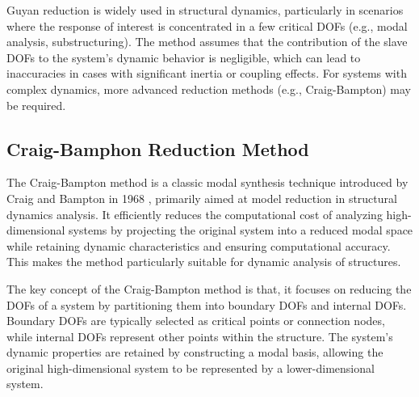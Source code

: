 \documentclass[a4paper, 10pt, conference]{ieeeconf}      %
\begin{document}
Guyan reduction is widely used in structural dynamics, particularly in scenarios where the response of interest is concentrated in a few critical DOFs (e.g., modal analysis, substructuring). The method assumes that the contribution of the slave DOFs to the system's dynamic behavior is negligible, which can lead to inaccuracies in cases with significant inertia or coupling effects. For systems with complex dynamics, more advanced reduction methods (e.g., Craig-Bampton) may be required.

\subsection{Craig-Bamphon Reduction Method} \label{sec22}

The Craig-Bampton method is a classic modal synthesis technique introduced by Craig and Bampton in 1968 \cite{Craig1968}, primarily aimed at model reduction in structural dynamics analysis. It efficiently reduces the computational cost of analyzing high-dimensional systems by projecting the original system into a reduced modal space while retaining dynamic characteristics and ensuring computational accuracy. This makes the method particularly suitable for dynamic analysis of structures.

The key concept of the Craig-Bampton method is that, it focuses on reducing the DOFs of a system by partitioning them into boundary DOFs and internal DOFs. Boundary DOFs are typically selected as critical points or connection nodes, while internal DOFs represent other points within the structure. The system's dynamic properties are retained by constructing a modal basis, allowing the original high-dimensional system to be represented by a lower-dimensional system.
\end{document}
